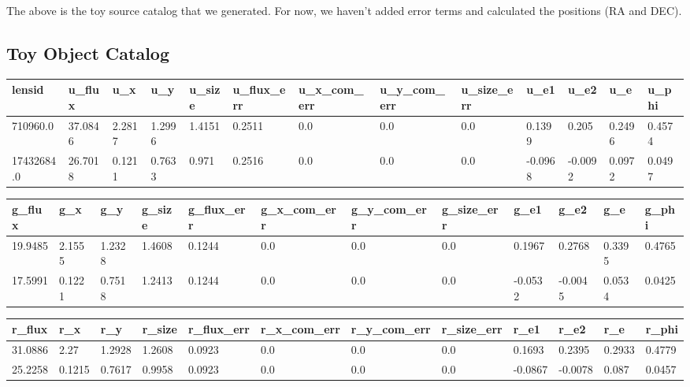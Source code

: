 \documentclass[\docopts]{\docclass}
\begin{document}
The above is the toy source catalog that we generated. For now, we haven't added error terms and calculated the positions (RA and DEC).

\subsection{Toy Object Catalog}
\label{subsec:toyobject}

\begin{table}[!h]
\centering

\begin{tabular}{|l|l|l|l|l|l|l|l|l|l|l|l|l|}
\hline
lensid     & u\_flux & u\_x   & u\_y   & u\_size & u\_flux\_err & u\_x\_com\_err & u\_y\_com\_err & u\_size\_err & u\_e1   & u\_e2   & u\_e   & u\_phi \\ \hline
710960.0   & 37.0846 & 2.2817 & 1.2996 & 1.4151  & 0.2511       & 0.0            & 0.0            & 0.0          & 0.1399  & 0.205   & 0.2496 & 0.4574 \\ \hline
17432684.0 & 26.7018 & 0.1211 & 0.7633 & 0.971   & 0.2516       & 0.0            & 0.0            & 0.0          & -0.0968 & -0.0092 & 0.0972 & 0.0497 \\ \hline
\end{tabular}

\begin{tabular}{|l|l|l|l|l|l|l|l|l|l|ll|}
\hline
g\_flux & g\_x   & g\_y   & g\_size & g\_flux\_err & g\_x\_com\_err & g\_y\_com\_err & g\_size\_err & g\_e1   & g\_e2   & g\_e   & g\_phi	\\ \hline
19.9485 & 2.1555 & 1.2328 & 1.4608  & 0.1244       & 0.0            & 0.0            & 0.0          & 0.1967  & 0.2768  & 0.3395 & 0.4765 \\ \hline
17.5991 & 0.1221 & 0.7518 & 1.2413  & 0.1244       & 0.0            & 0.0            & 0.0          & -0.0532 & -0.0045 & 0.0534	& 0.0425	\\ \hline
\end{tabular}


\begin{tabular}{|l|l|l|l|l|l|l|l|l|l|l|l|}
\hline
r\_flux & r\_x   & r\_y   & r\_size & r\_flux\_err & r\_x\_com\_err & r\_y\_com\_err & r\_size\_err & r\_e1   & r\_e2   & r\_e   & r\_phi \\ \hline
31.0886 & 2.27   & 1.2928 & 1.2608  & 0.0923       & 0.0            & 0.0            & 0.0          & 0.1693  & 0.2395  & 0.2933 & 0.4779 \\
25.2258 & 0.1215 & 0.7617 & 0.9958  & 0.0923       & 0.0            & 0.0            & 0.0          & -0.0867 & -0.0078 & 0.087  & 0.0457 \\ \hline
\end{tabular}


\end{table}
\end{document}
